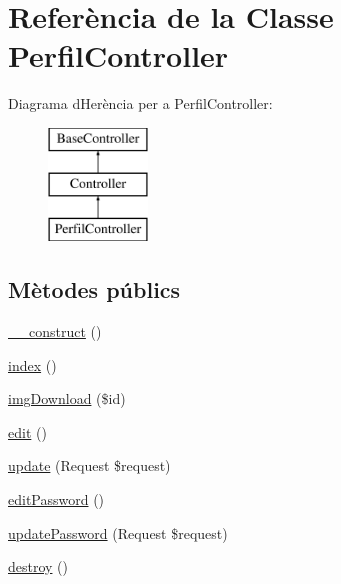\hypertarget{class_app_1_1_http_1_1_controllers_1_1_perfil_controller}{}\section{Referència de la Classe Perfil\+Controller}
\label{class_app_1_1_http_1_1_controllers_1_1_perfil_controller}
Diagrama d\textquotesingle{}Herència per a Perfil\+Controller\+:\begin{figure}[H]
\begin{center}
\leavevmode
\includegraphics[height=3.000000cm]{class_app_1_1_http_1_1_controllers_1_1_perfil_controller}
\end{center}
\end{figure}
\subsection*{Mètodes públics}
\begin{DoxyCompactItemize}
\item 
\mbox{\hyperlink{class_app_1_1_http_1_1_controllers_1_1_perfil_controller_a095c5d389db211932136b53f25f39685}{\+\_\+\+\_\+construct}} ()
\item 
\mbox{\hyperlink{class_app_1_1_http_1_1_controllers_1_1_perfil_controller_a149eb92716c1084a935e04a8d95f7347}{index}} ()
\item 
\mbox{\hyperlink{class_app_1_1_http_1_1_controllers_1_1_perfil_controller_ac234debaf71e6b0954da09ab8f71ddf2}{img\+Download}} (\$id)
\item 
\mbox{\hyperlink{class_app_1_1_http_1_1_controllers_1_1_perfil_controller_a5cb75cbb16467eb1768837d126dc535b}{edit}} ()
\item 
\mbox{\hyperlink{class_app_1_1_http_1_1_controllers_1_1_perfil_controller_afdc1029c759eec7e6241e0265b43551a}{update}} (Request \$request)
\item 
\mbox{\hyperlink{class_app_1_1_http_1_1_controllers_1_1_perfil_controller_aa93f8f1b0a90e8ac8d5263a2aaa06ebf}{edit\+Password}} ()
\item 
\mbox{\hyperlink{class_app_1_1_http_1_1_controllers_1_1_perfil_controller_a3321bf199c17771d80e2af0428a2719a}{update\+Password}} (Request \$request)
\item 
\mbox{\hyperlink{class_app_1_1_http_1_1_controllers_1_1_perfil_controller_aa118461de946085fe42989193337044a}{destroy}} ()
\end{DoxyCompactItemize}



